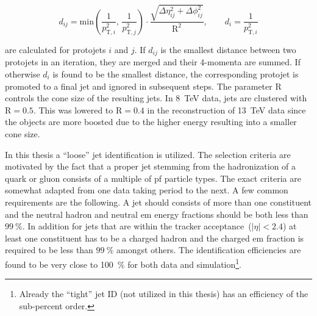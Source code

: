 \begin{equation}
d_{ij}=\mathrm{min}\left(\frac{1}{p_{\mathrm{T},i}^{2}},\,\frac{1}{p_{\mathrm{T},j}^{2}}\right)\cdot\frac{\sqrt{\Delta\eta_{ij}^{2}+\Delta\phi_{ij}^{2}}}{\mathrm{R}^2},\qquad d_{i}=\frac{1}{p_{\mathrm{T},i}^{2}}
\end{equation}

are calculated for protojets $i$ and $j$.  If $d_{ij}$ is the smallest distance between two protojets in an iteration, they are merged and their 4-momenta are summed. If otherwise $d_{i}$ is found to be the smallest distance, the corresponding protojet is promoted to a final jet and ignored in subsequent steps. The parameter $\mathrm{R}$ controls the cone size of the resulting jets. In 8~TeV data, jets are clustered with $\mathrm{R}=0.5$. This was lowered to $\mathrm{R}=0.4$ in the reconstruction of 13~TeV data since the objects are more boosted due to the higher energy resulting into a smaller cone size.

In this thesis a ``loose'' jet identification is utilized. The selection criteria are motivated by the fact that a proper jet stemming from the hadronization of a quark or gluon consists of a multiple of \gls{pf} particle types. The exact criteria are somewhat adapted from one data taking period to the next. A few common requirements are the following. A jet should consists of more than one constituent and the neutral hadron and neutral \gls{em} energy fractions should be both less than $99~\%$. In addition for jets that are within the tracker acceptance~($|\eta|<2.4$) at least one constituent has to be a charged hadron and the charged \gls{em} fraction is required to be less than $99~\%$ amongst others. The identification efficiencies are found to be very close to 100~\% for both data and simulation\footnote{Already the ``tight'' jet ID (not utilized in this thesis) has an efficiency of the sub-percent order.}.

